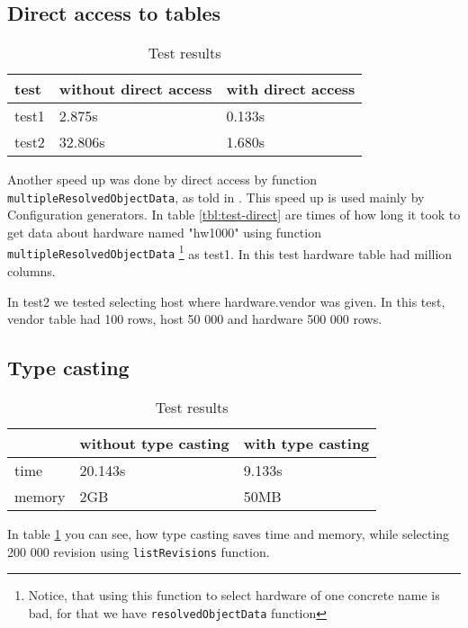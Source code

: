 \documentclass[deska]{subfiles}
\begin{document}
\subsection{Direct access to tables}
\label{sec:test-direct}

\label{tbl:test-direct}
\begin{longtable}{ l | l | l }
\caption{Test results}\\
test & without direct access & with direct access \\
\hline
\endhead
test1 & 2.875s & 0.133s \\
test2 & 32.806s & 1.680s \\
\end{longtable}

Another speed up was done by direct access by function {\tt multipleResolvedObjectData}, as told in .
This speed up is used mainly by Configuration generators.
In table \ref{tbl:test-direct} are times of how long it took to get data about hardware named "hw1000" using function {\tt multipleResolvedObjectData}
\footnote{Notice, that using this function to select hardware of one concrete name is bad, for that we have
{\tt resolvedObjectData} function}
as test1. In this test hardware table had million columns.

In test2 we tested selecting host where hardware.vendor was given. In this test, vendor table
had 100 rows, host 50 000 and hardware 500 000 rows.

\subsection{Type casting}
\label{sec:test-cast}

\begin{longtable}{ l | l | l }
\caption{Test results}
\label{tbl:test-casting-cmp}\\
& without type casting & with type casting \\
\hline
\endhead
time & 20.143s & 9.133s \\
memory & 2GB & 50MB \\
\end{longtable}

In table \ref{tbl:test-casting-cmp} you can see, how type casting saves time and memory,
while selecting 200 000 revision using {\tt listRevisions} function.
\end{document}
